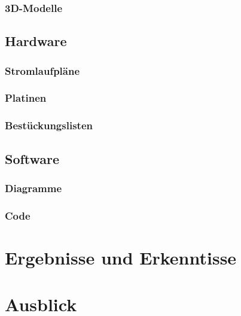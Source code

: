 \documentclass[titlepage,12pt,twoside]{article}
\begin{document}
\subsubsection{3D-Modelle}

\subsection{Hardware}
\subsubsection{Stromlaufpläne}
\subsubsection{Platinen}
\subsubsection{Bestückungslisten}

\subsection{Software}
\subsubsection{Diagramme}
\subsubsection{Code}

\section{Ergebnisse und Erkenntisse}

\section{Ausblick}

\end{document}
